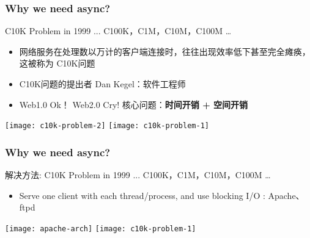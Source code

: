 \begin{frame}[fragile]	
	\frametitle{Why we need async?}
	C10K Problem in 1999 ... C100K，C1M，C10M，C100M …
	\begin{itemize}
		\item 网络服务在处理数以万计的客户端连接时，往往出现效率低下甚至完全瘫痪，这被称为 C10K问题
		\item C10K问题的提出者 Dan Kegel：软件工程师
		\item Web1.0 Ok！  Web2.0 Cry!   \pause 核心问题：\textbf{时间开销 + 空间开销}
	\end{itemize}	
	
	\centering
	
	\texttt{[image: c10k-problem-2]}
	\texttt{[image: c10k-problem-1]}
\end{frame}


\begin{frame}[fragile]	
	\frametitle{Why we need async?}
	
	解决方法: C10K Problem in 1999 ... C100K，C1M，C10M，C100M …
	\begin{itemize}
		\item Serve one client with each thread/process, and use blocking I/O : Apache、ftpd

		
	\end{itemize}	
	
	\centering
	
	\texttt{[image: apache-arch]}
	\texttt{[image: c10k-problem-1]}
\end{frame}

